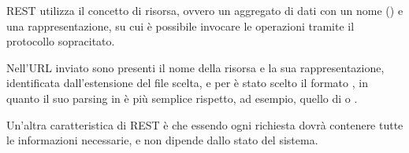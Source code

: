 REST utilizza il concetto di risorsa, ovvero un aggregato di dati con un nome () e una rappresentazione, su cui è possibile invocare le operazioni  tramite il protocollo sopracitato.

Nell'URL inviato sono presenti il nome della risorsa e la sua rappresentazione, identificata dall'estensione del file scelta, e per \ProjectName è stato scelto il formato , in quanto il suo parsing in  è più semplice rispetto, ad esempio, quello di  o .

Un'altra caratteristica di REST è che essendo  ogni richiesta dovrà contenere tutte le informazioni necessarie, e non dipende dallo stato del sistema.